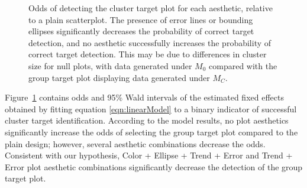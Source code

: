 \documentclass[12pt]{article}\usepackage[]{graphicx}\usepackage[]{color}
\makeatletter
\newenvironment{kframe}{%
 \def\at@end@of@kframe{}%
 \ifinner\ifhmode%
  \def\at@end@of@kframe{\end{minipage}}%
  \begin{minipage}{\columnwidth}%
 \fi\fi%
 \def\FrameCommand##1{\hskip\@totalleftmargin \hskip-\fboxsep
 \colorbox{shadecolor}{##1}\hskip-\fboxsep
     \hskip-\linewidth \hskip-\@totalleftmargin \hskip\columnwidth}%
 \MakeFramed {\advance\hsize-\width
   \@totalleftmargin\z@ \linewidth\hsize
   \@setminipage}}%
 {\par\unskip\endMakeFramed%
 \at@end@of@kframe}
\newenvironment{knitrout}{}{} %
\makeatother
\begin{document}
\begin{appendix}
\begin{figure}[ht]
\begin{knitrout}
\begin{kframe}
{\ttfamily\noindent\bfseries\color{errorcolor}{\#\# Error in eval(expr, envir, enclos): object 'group.fixef2' not found}}

{\ttfamily\noindent\bfseries\color{errorcolor}{\#\# Error in ggplot(data, aesthetics, environment = env): object 'group.fixef2' not found}}

{\ttfamily\noindent\bfseries{}}

{\ttfamily\noindent\bfseries{}}

{\ttfamily\noindent\bfseries{}}

{\ttfamily\noindent\bfseries{}}\end{kframe}
\end{knitrout}
\caption{Odds of detecting the cluster target plot for each aesthetic, relative to a plain scatterplot. The presence of error lines or bounding ellipses significantly decreases the probability of correct target detection, and no aesthetic successfully increases the probability of correct target detection. This may be due to differences in cluster size for null plots, with data generated under $M_0$ compared with the group target plot displaying data generated under $M_C$. \label{fig:group.fixef}}
\end{figure}


Figure~\ref{fig:group.fixef} contains odds and 95\% Wald intervals of the estimated fixed effects obtained by fitting equation \ref{eqn:linearModel} to a binary indicator of successful cluster target identification. 
According to the model results, no plot aesthetics significantly increase the odds of selecting the group target plot compared to the plain design; however, several aesthetic combinations decrease the odds. Consistent with our hypothesis,  Color + Ellipse + Trend + Error and Trend + Error plot aesthetic combinations significantly decrease the detection of the group target plot. 


\end{appendix}
\end{document}
